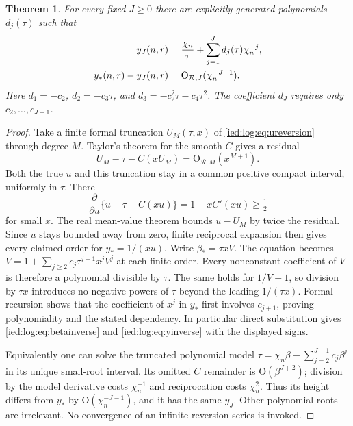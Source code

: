 \documentclass[11pt,letterpaper]{article}
\newtheorem{theorem}{Theorem}[section]
\theoremstyle{remark}\newtheorem{remark}[theorem]{Remark}
\newcommand{\Oh}{\mathrm O}\newcommand{\supp}{\operatorname{supp}}
\begin{document}
\begin{theorem}\label{ied:log:thm:finiteinverse}
For every fixed $J\ge0$ there are explicitly generated polynomials $d_j(\tau)$ such that
\begin{align}\label{ied:log:eq:yJ}
 y_J(n,r)&=\frac{\chi_n}\tau+\sum_{j=1}^Jd_j(\tau)\chi_n^{-j},\\
 y_*(n,r)-y_J(n,r)&=\Oh_{\mathcal R,J}(\chi_n^{-J-1}).\notag
\end{align}
Here $d_1=-c_2$, $d_2=-c_3\tau$, and
$d_3=-c_2^2\tau-c_4\tau^2$. The coefficient $d_J$ requires only
$c_2,\ldots,c_{J+1}$.
\end{theorem}
\begin{proof}
Take a finite formal truncation $U_M(\tau,x)$ of \eqref{ied:log:eq:ureversion} through degree $M$. Taylor's theorem for the smooth $C$ gives a residual
\[
 U_M-\tau-C(xU_M)=\Oh_{\mathcal R,M}(x^{M+1}).
\]
Both the true $u$ and this truncation stay in a common positive compact interval, uniformly in $\tau$. There
\[
 \frac\partial{\partial u}\{u-\tau-C(xu)\}
       =1-xC'(xu)\ge\tfrac12
\]
for small $x$. The real mean-value theorem bounds $u-U_M$ by twice the residual. Since $u$ stays bounded away from zero, finite reciprocal expansion then gives every claimed order for $y_*=1/(xu)$. Write $\beta_*=\tau xV$. The equation becomes $V=1+\sum_{j\ge2}c_j\tau^{j-1}x^jV^j$ at each finite order. Every nonconstant coefficient of $V$ is therefore a polynomial divisible by $\tau$. The same holds for $1/V-1$, so division by $\tau x$ introduces no negative powers of $\tau$ beyond the leading $1/(\tau x)$. Formal recursion shows that the coefficient of $x^j$ in $y_*$ first involves $c_{j+1}$, proving polynomiality and the stated dependency. In particular direct substitution gives \eqref{ied:log:eq:betainverse} and \eqref{ied:log:eq:yinverse} with the displayed signs.

Equivalently one can solve the truncated polynomial model
$\tau=\chi_n\beta-\sum_{j=2}^{J+1}c_j\beta^j$ in its unique small-root interval. Its omitted $C$ remainder is $\Oh(\beta^{J+2})$; division by the model derivative costs $\chi_n^{-1}$ and reciprocation costs $\chi_n^2$. Thus its height differs from $y_*$ by $\Oh(\chi_n^{-J-1})$, and it has the same $y_J$. Other polynomial roots are irrelevant. No convergence of an infinite reversion series is invoked.
\end{proof}
\end{document}

